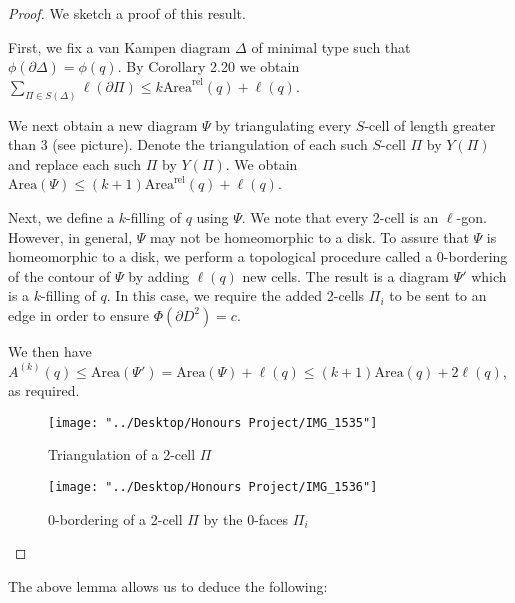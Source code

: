 \documentclass[12pt]{article}
\newcommand{\vs}{\vskip10pt}
\begin{document}
	\begin{proof}
		
		We sketch a proof of this result. 
		
		\vs 
		
		First, we fix a van Kampen diagram $\Delta$ of minimal type such that $\phi(\partial \Delta) = \phi(q)$. By Corollary 2.20 we obtain $\sum_{\Pi \in S(\Delta)} \ell(\partial \Pi) \leq k \text{Area}^{\text{rel}}(q) + \ell(q)$. 
		
		\vs 
		
		We next obtain a new diagram $\Psi$ by triangulating every $S$-cell of length greater than 3 (see picture). Denote the triangulation of each such $S$-cell $\Pi$ by $Y(\Pi)$ and replace each such $\Pi$ by $Y(\Pi)$. We obtain $\text{Area} (\Psi) \leq (k+1) \text{Area}^{\text{rel}}(q) + \ell(q)$. 
		
		\vs 
		
		Next, we define a $k$-filling of $q$ using $\Psi$. We note that every 2-cell is an $\ell$-gon. However, in general, $\Psi$ may not be homeomorphic to a disk. To assure that $\Psi$ is homeomorphic to a disk, we perform a topological procedure called a 0-bordering of the contour of $\Psi$ by adding $\ell(q)$ new cells. The result is a diagram $\Psi'$ which is a $k$-filling of $q$. In this case, we require the added 2-cells $\Pi_i$ to be sent to an edge in order to ensure $\Phi(\partial D^2) = c$. 
		
		\vs 
		
		We then have $A^{(k)}(q) \leq \text{Area}(\Psi') = \text{Area}(\Psi) + \ell(q) \leq (k+1) \text{Area}(q) + 2 \ell(q)$, as required. 
		
		\vs
		
\begin{figure} [H]
	\centering
	\texttt{[image: "../Desktop/Honours Project/IMG\_1535"]}
	\caption{Triangulation of a 2-cell $\Pi$}
	\label{fig:img1535}
\end{figure}

\begin{figure} [H]
	\centering
	\texttt{[image: "../Desktop/Honours Project/IMG\_1536"]}
	\caption{0-bordering of a 2-cell $\Pi$ by the 0-faces $\Pi_i$}
	\label{fig:img1536}
\end{figure}


	\end{proof}

	The above lemma allows us to deduce the following: 
	
	\vs
	
\end{document}
